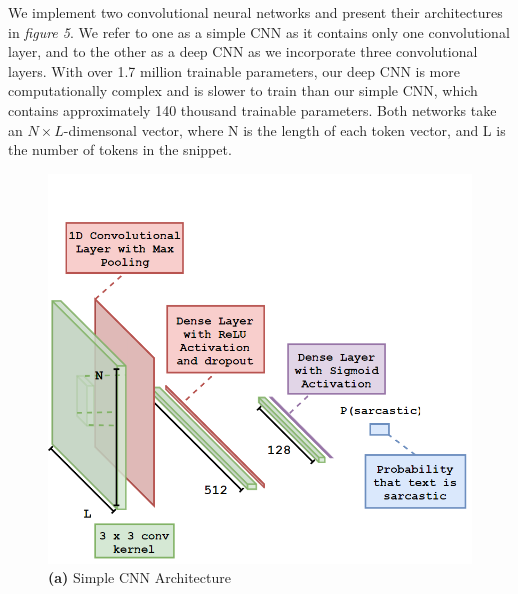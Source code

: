 \documentclass[12pt,a4paper]{article}
\begin{document}
We implement two convolutional neural networks and present their architectures in \textit{figure 5}. We refer to one as a simple CNN as it contains only one convolutional layer, and to the other as a deep CNN as we incorporate three convolutional layers. With over 1.7 million trainable parameters, our deep CNN is more computationally complex and is slower to train than our simple CNN, which contains approximately 140 thousand trainable parameters. Both networks take an $N \times L$-dimensonal vector, where N is the length of each token vector, and L is the number of tokens in the snippet.\vspace{-16pt}

\hspace{-20pt}\begin{minipage}{0.4\textwidth}
	\begin{figure}[H]
		\includegraphics[width=1\textwidth]{Images/CNNarchNew.png}
		\centering\textbf{(a)} Simple CNN Architecture\\
	\end{figure}
\end{minipage}
\hspace{10pt}
\end{document}
